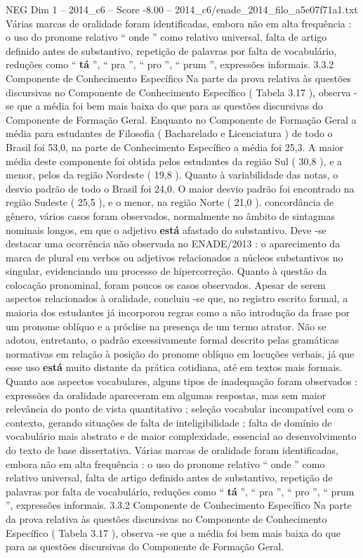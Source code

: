 \begin{textsample}{NEG Dim 1 – 2014\_c6 – Score -8.00 – 2014\_c6/enade\_2014\_filo\_a5e07f71a1.txt}
Várias marcas de oralidade foram identificadas, embora não em alta frequência : o uso do pronome relativo “ onde ” como relativo universal, falta de artigo definido antes de substantivo, repetição de palavras por falta de vocabulário, reduções como “ \textbf{tá} ”, “ pra ”, “ pro ”, “ prum ”, expressões informais. 3.3.2 Componente de Conhecimento Específico Na parte da prova relativa às questões discursivas no Componente de Conhecimento Específico ( Tabela 3.17 ), observa -se que a média foi bem mais baixa do que para as questões discursivas do Componente de Formação Geral.
Enquanto no Componente de Formação Geral a média para estudantes de Filosofia ( Bacharelado e Licenciatura ) de todo o Brasil foi 53,0, na parte de Conhecimento Específico a média foi 25,3.
A maior média deste componente foi obtida pelos estudantes da região Sul ( 30,8 ), e a menor, pelos da região Nordeste ( 19,8 ).
Quanto à variabilidade das notas, o desvio padrão de todo o Brasil foi 24,0.
O maior desvio padrão foi encontrado na região Sudeste ( 25,5 ), e o menor, na região Norte ( 21,0 ). concordância de gênero, vários casos foram observados, normalmente no âmbito de sintagmas nominais longos, em que o adjetivo \textbf{está} afastado do substantivo.
Deve -se destacar uma ocorrência não observada no ENADE/2013 : o aparecimento da marca de plural em verbos ou adjetivos relacionados a núcleos substantivos no singular, evidenciando um processo de hipercorreção.
Quanto à questão da colocação pronominal, foram poucos os casos observados.
Apesar de serem aspectos relacionados à oralidade, concluiu -se que, no registro escrito formal, a maioria dos estudantes já incorporou regras como a não introdução da frase por um pronome oblíquo e a próclise na presença de um termo atrator.
Não se adotou, entretanto, o padrão excessivamente formal descrito pelas gramáticas normativas em relação à posição do pronome oblíquo em locuções verbais, já que esse uso \textbf{está} muito distante da prática cotidiana, até em textos mais formais.
Quanto aos aspectos vocabulares, alguns tipos de inadequação foram observados : expressões da oralidade apareceram em algumas respostas, mas sem maior relevância do ponto de vista quantitativo ; seleção vocabular incompatível com o contexto, gerando situações de falta de inteligibilidade ; falta de domínio de vocabulário mais abstrato e de maior complexidade, essencial ao desenvolvimento do texto de base dissertativa.
Várias marcas de oralidade foram identificadas, embora não em alta frequência : o uso do pronome relativo “ onde ” como relativo universal, falta de artigo definido antes de substantivo, repetição de palavras por falta de vocabulário, reduções como “ \textbf{tá} ”, “ pra ”, “ pro ”, “ prum ”, expressões informais. 3.3.2 Componente de Conhecimento Específico Na parte da prova relativa às questões discursivas no Componente de Conhecimento Específico ( Tabela 3.17 ), observa -se que a média foi bem mais baixa do que para as questões discursivas do Componente de Formação Geral.

\end{textsample}
